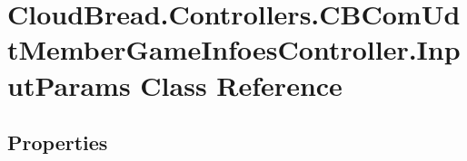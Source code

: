 \hypertarget{class_cloud_bread_1_1_controllers_1_1_c_b_com_udt_member_game_infoes_controller_1_1_input_params}{}\section{Cloud\+Bread.\+Controllers.\+C\+B\+Com\+Udt\+Member\+Game\+Infoes\+Controller.\+Input\+Params Class Reference}
\label{class_cloud_bread_1_1_controllers_1_1_c_b_com_udt_member_game_infoes_controller_1_1_input_params}
\subsection*{Properties}
